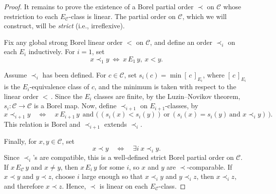 \documentclass[11pt]{paper}
\newcommand{\cC}{\mathcal C}
\begin{document}
\begin{proof}
\medskip It remains to prove the existence of a Borel partial order $\prec$ on $\cC$ whose restriction to
each $E_\cC$-class is linear. The partial order on $\cC$, which we will construct, will be {\em strict} (i.e., irreflexive).

Fix any global strong Borel linear order $<$ on $\cC$, and define an order $\prec_i$ on each $E_i$ inductively. For $i=1$, set
\[
x \prec_1 y \ \Longleftrightarrow \ x\, E_1\, y, \ x<y.
\]

Assume $\prec_i$ has been defined. For $c\in\cC$, set $s_i(c)  = \displaystyle \min [\, c\, ]_{E_i}$,
where $ [\, c\, ]_{E_i}$ is the $E_i$-equivalence class of $c$, and the minimum is taken with respect
to the linear order $<$\,. Since the $E_i$ classes are finite,
by the Luzin--Novikov theorem, $s_i\colon \cC\to\cC$ is a Borel map. Now, define $\prec_{i+1}$ on
$E_{i+1}$-classes, by
\[
x \prec_{i+1} y \quad \Longleftrightarrow \quad
x\, E_{i+1}\, y \ \ \text{and\ } \bigl(\, (s_i(x)<s_i(y)) \ \text{or}\  (s_i(x)=s_i(y)
\ \text{and\ }x\prec_i y)\, \bigr).
\]
This relation is Borel and $\prec_{i+1}$ extends $\prec_i$.

Finally, for $x, y \in\cC$, set
\[
x \prec y \quad  \Longleftrightarrow \quad \exists i\ x\prec_i y.
\]
Since $\prec_i$'s are compatible, this is a well-defined strict Borel partial order on $\cC$.
If $x\, E_{\cC}\, y$ and $x\ne y$, then $x\, E_i\, y$ for some $i$, so $x$ and $y$ are
$\prec$-comparable. If $x\prec y$ and $y\prec z$, choose $i$ large enough so that $x \prec_i y$
and $y \prec_i z$, then
$x\prec_i z$, and therefore $x\prec z$. Hence, $\prec$ is linear on each $E_{\cC}$-class.  \end{proof}
\end{document}
